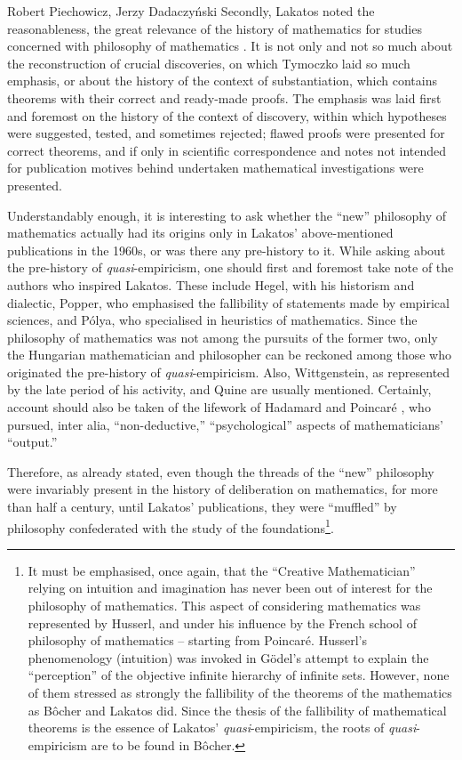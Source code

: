 \begin{artengenv}{Robert Piechowicz, Jerzy Dadaczyński}
Secondly, Lakatos noted the reasonableness, the great relevance of the history of mathematics for studies concerned with philosophy of mathematics
\parencite[][p.2]{lakatos_proofs_1976}.
 It is not only and not so much about the reconstruction of crucial discoveries, on which Tymoczko laid so much emphasis, or about the history of the context of substantiation, which contains theorems with their correct and ready-made proofs. The emphasis was laid first and foremost on the history of the context of discovery, within which hypotheses were suggested, tested, and sometimes rejected; flawed proofs were presented for correct theorems, and if only in scientific correspondence and notes not intended for publication motives behind undertaken mathematical investigations were presented.

Understandably enough, it is interesting to ask whether the ``new'' philosophy of mathematics actually had its origins only in Lakatos' above-mentioned publications in the 1960s, or was there any pre-history to it. While asking about the pre-history of \textit{quasi}-empiricism, one should first and foremost take note of the authors who inspired Lakatos. These include Hegel, with his historism and dialectic, Popper, who emphasised the fallibility of statements made by empirical sciences, and Pólya, who specialised in heuristics of mathematics. Since the philosophy of mathematics was not among the pursuits of the former two, only the Hungarian mathematician and philosopher can be reckoned among those who originated the pre-history of \textit{quasi}-empiricism. Also, Wittgenstein, as represented by the late period of his activity, and Quine are usually mentioned. Certainly, account should also be taken of the lifework of Hadamard
\parencite*[][]{hadamard_psychology_1945}
 and Poincaré 
\parencite*[][]{poincare_valeur_1904},
 who pursued, inter alia, ``non-deductive,'' ``psychological'' aspects of mathematicians' ``output.''

Therefore, as already stated, even though the threads of the ``new'' philosophy were invariably present in the history of deliberation on mathematics, for more than half a century, until Lakatos' publications, they were ``muffled'' by philosophy confederated with the study of the foundations\footnote{It must be emphasised, once again, that the ``Creative Mathematician'' relying on intuition and imagination has never been out of interest for the philosophy of mathematics. This aspect of considering mathematics was represented by Husserl, and under his influence by the French school of philosophy of mathematics -- starting from Poincaré. Husserl's phenomenology (intuition) was invoked in Gödel's attempt to explain the ``perception'' of the objective infinite hierarchy of infinite sets. However, none of them stressed as strongly the fallibility of the theorems of the mathematics as Bôcher and Lakatos did. Since the thesis of the fallibility of mathematical theorems is the essence of Lakatos' \textit{quasi}-empiricism, the roots of \textit{quasi}-empiricism are to be found in Bôcher.}.


\end{artengenv}
